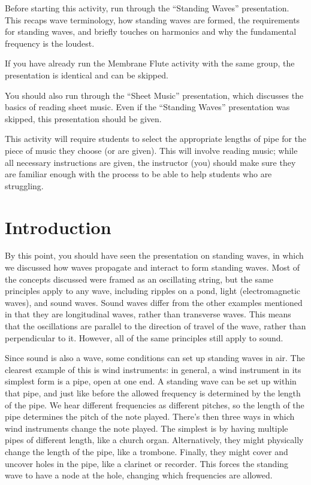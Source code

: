 \documentclass{article}
\begin{document}
\begin{instructoronly}
    Before starting this activity, run through the ``Standing Waves'' presentation. This recaps wave terminology, how standing waves are formed, the requirements for standing waves, and briefly touches on harmonics and why the fundamental frequency is the loudest.

    If you have already run the Membrane Flute activity with the same group, the presentation is identical and can be skipped.

    You should also run through the ``Sheet Music'' presentation, which discusses the basics of reading sheet music. Even if the ``Standing Waves'' presentation was skipped, this presentation should be given.

    This activity will require students to select the appropriate lengths of pipe for the piece of music they choose (or are given). This will involve reading music; while all necessary instructions are given, the instructor (you) should make sure they are familiar enough with the process to be able to help students who are struggling.
\end{instructoronly}

\section{Introduction}

By this point, you should have seen the presentation on standing waves, in which we discussed how waves propagate and interact to form standing waves. Most of the concepts discussed were framed as an oscillating string, but the same principles apply to any wave, including ripples on a pond, light (electromagnetic waves), and sound waves. Sound waves differ from the other examples mentioned in that they are longitudinal waves, rather than transverse waves. This means that the oscillations are parallel to the direction of travel of the wave, rather than perpendicular to it. However, all of the same principles still apply to sound.

Since sound is also a wave, some conditions can set up standing waves in air. The clearest example of this is wind instruments: in general, a wind instrument in its simplest form is a pipe, open at one end. A standing wave can be set up within that pipe, and just like before the allowed frequency is determined by the length of the pipe. We hear different frequencies as different pitches, so the length of the pipe determines the pitch of the note played. There's then three ways in which wind instruments change the note played. The simplest is by having multiple pipes of different length, like a church organ. Alternatively, they might physically change the length of the pipe, like a trombone. Finally, they might cover and uncover holes in the pipe, like a clarinet or recorder. This forces the standing wave to have a node at the hole, changing which frequencies are allowed.
\end{document}
